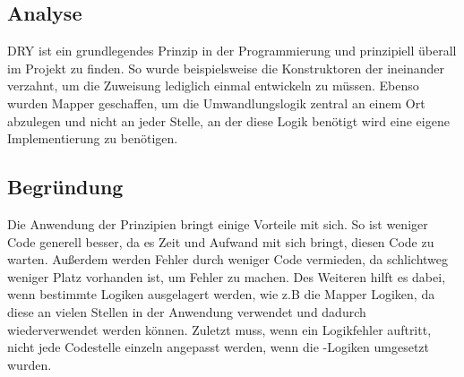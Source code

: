 		\subsection{Analyse}
		DRY ist ein grundlegendes Prinzip in der Programmierung und prinzipiell überall im Projekt zu finden. So wurde beispielsweise die Konstruktoren der  ineinander verzahnt, um die Zuweisung lediglich einmal entwickeln zu müssen. Ebenso wurden Mapper geschaffen, um die Umwandlungslogik zentral an einem Ort abzulegen und nicht an jeder Stelle, an der diese Logik benötigt wird eine eigene Implementierung zu benötigen.
		
		\subsection{Begründung}
		Die Anwendung der  Prinzipien bringt einige Vorteile mit sich. So ist weniger Code generell besser, da es Zeit und Aufwand mit sich bringt, diesen Code zu warten. Außerdem werden Fehler durch weniger Code vermieden, da schlichtweg weniger Platz vorhanden ist, um Fehler zu machen. Des Weiteren hilft es dabei, wenn bestimmte Logiken ausgelagert werden, wie z.B die Mapper Logiken, da diese an vielen Stellen in der Anwendung verwendet und dadurch wiederverwendet werden können. Zuletzt muss, wenn ein Logikfehler auftritt, nicht jede Codestelle einzeln angepasst werden, wenn die -Logiken umgesetzt wurden.